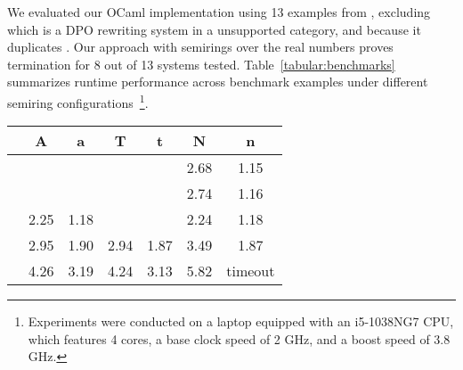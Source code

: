 We evaluated our OCaml implementation using 13 examples from \cite[Table 1]{endrullis2024generalized_arxiv_v2}, excluding \cite[Example 6.4]{endrullis2024generalized_arxiv_v2} which is a DPO rewriting system in a unsupported category, and \cite[Example 6]{bruggink2014termination} because it duplicates \cite[Example 4]{bruggink2015proving}. Our approach with semirings over the real numbers proves termination for 8 out of 13 systems tested. Table~\ref{tabular:benchmarks} summarizes runtime performance 
across benchmark examples under different semiring configurations~\footnote{Experiments were conducted on a laptop equipped with an i5-1038NG7 CPU, which features 4 cores, a base clock speed of 2 GHz, and a boost speed of 3.8 GHz.}.


\begin{table}[htb]   
    \renewcommand{\arraystretch}{1.2}
    \centering
\begin{tabular}{|c|c|c|c|c|c|c |}
    \hline
     &\;\;A\;\;&\;\;a\;\;&\;\;T\;\;&\;\;t\;\;&\;\; N\;\;&\;\;n\;\; \\
    \hline
    \cite[Example 6.2]{endrullis2024generalized_arxiv_v2} & & & & & 2.68 &1.15   \\
    \cite[Example 6.3]{endrullis2024generalized_arxiv_v2} & & & & & 2.74 &1.16   \\
    \cite[Example D.3]{endrullis2024generalized_arxiv_v2} &2.25 
    & 1.18
    & & & 2.24& 1.18    \\
    \cite[Example 3.8]{plump1995ontermination}
 & 2.95& 1.90 & 2.94 &1.87  & 3.49  &1.87   \\
    \cite[Example 4]{plump2018modular} &4.26& 3.19&  4.24 & 3.13 &
    5.82
    & timeout  \\


\end{tabular}
\end{table}
